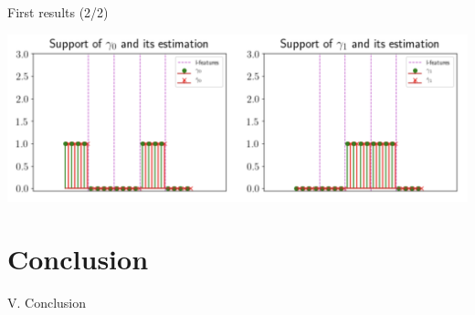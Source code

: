 \documentclass{beamer}
\begin{document}
\begin{frame}{First results (2/2)}

\centering
\includegraphics[width=1\textwidth]{./figures/gamma_estimation}

\end{frame}


\section{Conclusion}

\begin{frame}[noframenumbering]
\Large \centering
\textcolor{blue_pres}{V.} Conclusion
\end{frame}
\end{document}
